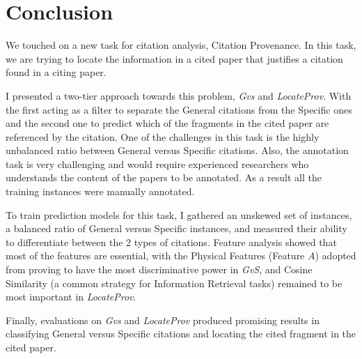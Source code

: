\chapter{Conclusion}
\label{conclusion}
We touched on a new task for citation analysis, Citation Provenance. In this task, we are trying to locate the information in a cited paper that justifies a citation found in a citing paper.

I presented a two-tier approach towards this problem, {\it Gvs} and {\it LocateProv}. With the first acting as a filter to separate the General citations from the Specific ones and the second one to predict which of the fragments in the cited paper are referenced by the citation. One of the challenges in this task is the highly unbalanced ratio between General versus Specific citations. Also, the annotation task is very challenging and would require experienced researchers who understands the content of the papers to be annotated. As a result all the training instances were manually annotated.

To train prediction models for this task, I gathered an unskewed set of instances, a balanced ratio of General versus Specific instances, and measured their ability to differentiate between the 2 types of citations. Feature analysis showed that most of the features are essential, with the Physical Features (Feature $A$) adopted from \cite{dongensemble} proving to have the most discriminative power in {\it GvS}, and Cosine Similarity (a common strategy for Information Retrieval tasks) remained to be most important in {\it LocateProv}.

Finally, evaluations on {\it Gvs} and {\it LocateProv} produced promising results in classifying General versus Specific citations and locating the cited fragment in the cited paper.